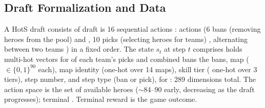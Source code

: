 \documentclass[journal]{IEEEtran}
\providecommand{\DIFaddtex}[1]{{\protect\color{blue} \sf #1}} %
\providecommand{\DIFdeltex}[1]{{\protect\color{red} \scriptsize #1}} %
\providecommand{\DIFaddbegin}{} %
\providecommand{\DIFaddend}{} %
\providecommand{\DIFdelbegin}{} %
\providecommand{\DIFdelend}{} %
\providecommand{\DIFadd}[1]{\texorpdfstring{\DIFaddtex{#1}}{#1}} %
\providecommand{\DIFdel}[1]{\texorpdfstring{\DIFdeltex{#1}}{}} %
\begin{document}
\subsection{Draft Formalization \DIFaddbegin \DIFadd{and Data}\DIFaddend }

A \DIFdelbegin \DIFdel{HotS draft consists of }\DIFdelend \DIFaddbegin \DIFadd{draft is }\DIFaddend 16 \DIFdelbegin \DIFdel{sequential actions : }\DIFdelend \DIFaddbegin \DIFadd{actions (}\DIFaddend 6 bans\DIFdelbegin \DIFdel{(removing heroes from the pool) and }\DIFdelend \DIFaddbegin \DIFadd{, }\DIFaddend 10 picks\DIFdelbegin \DIFdel{(selecting heroes for teams) , alternating between two teams }\DIFdelend \DIFaddbegin \DIFadd{) }\DIFaddend in a fixed order. The state \DIFdelbegin \DIFdel{$s_t$ at step $t$ comprises }\DIFdelend \DIFaddbegin \DIFadd{holds }\DIFaddend multi-hot vectors \DIFdelbegin \DIFdel{for }\DIFdelend \DIFaddbegin \DIFadd{of }\DIFaddend each team's picks and \DIFdelbegin \DIFdel{combined bans}\DIFdelend \DIFaddbegin \DIFadd{the bans, map }\DIFaddend (\DIFdelbegin \DIFdel{$\in \{0,1\}^{90}$ each), map identity (one-hot over }\DIFdelend 14\DIFdelbegin \DIFdel{maps}\DIFdelend ), skill tier (\DIFdelbegin \DIFdel{one-hot over }\DIFdelend 3\DIFdelbegin \DIFdel{tiers}\DIFdelend ), step\DIFdelbegin \DIFdel{number}\DIFdelend , and step type\DIFdelbegin \DIFdel{(ban or pick), for }\DIFdelend \DIFaddbegin \DIFadd{: }\DIFaddend 289 dimensions\DIFdelbegin \DIFdel{total. The action space is the set of available heroes ($\sim$84--90 early, decreasing as the draft progresses); terminal }\DIFdelend \DIFaddbegin \DIFadd{. Terminal }\DIFaddend reward is the game outcome. \DIFdelbegin %
\end{document}
